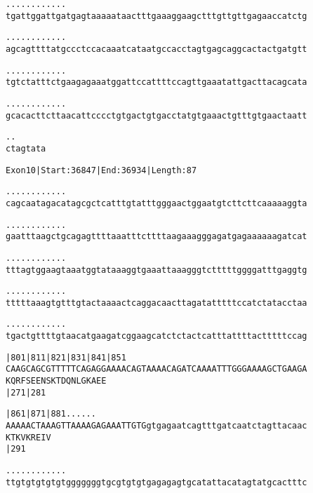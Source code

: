 \documentclass{article}
\begin{document}
\newpage
\begin{alltt}
  .    .    .    .    .    .    .    .    .    .    .    .
tgattggattgatgagtaaaaataactttgaaaggaagctttgttgttgagaaccatctg



  .    .    .    .    .    .    .    .    .    .    .    .
agcagttttatgccctccacaaatcataatgccacctagtgagcaggcactactgatgtt



  .    .    .    .    .    .    .    .    .    .    .    .
tgtctatttctgaagagaaatggattccattttccagttgaaatattgacttacagcata



  .    .    .    .    .    .    .    .    .    .    .    .
gcacacttcttaacattcccctgtgactgtgacctatgtgaaactgtttgtgaactaatt



  .    .
ctagtata


\end{alltt}
\newpage
\begin{alltt}
Exon 10 | Start: 36847 | End: 36934 | Length: 87

.    .    .    .    .    .    .    .    .    .    .    .
cagcaatagacatagcgctcatttgtatttgggaactggaatgtcttcttcaaaaaggta



.    .    .    .    .    .    .    .    .    .    .    .
gaatttaagctgcagagttttaaatttcttttaagaaagggagatgagaaaaaagatcat



.    .    .    .    .    .    .    .    .    .    .    .
tttagtggaagtaaatggtataaaggtgaaattaaagggtctttttggggatttgaggtg



.    .    .    .    .    .    .    .    .    .    .    .
tttttaaagtgtttgtactaaaactcaggacaacttagatatttttccatctatacctaa



.    .    .    .    .    .    .    .    .    .    .    .
tgactgttttgtaacatgaagatcggaagcatctctactcatttattttactttttccag



      |801      |811      |821      |831      |841      |851
CAAGCAGCGTTTTTCAGAGGAAAACAGTAAAACAGATCAAAATTTGGGAAAAGCTGAAGA
 K  Q  R  F  S  E  E  N  S  K  T  D  Q  N  L  G  K  A  E  E
                |271                          |281

      |861      |871      |881  .    .    .    .    .    .
AAAAACTAAAGTTAAAAGAGAAATTGTGgtgagaatcagtttgatcaatctagttacaac
 K  T  K  V  K  R  E  I  V
                |291

  .    .    .    .    .    .    .    .    .    .    .    .
ttgtgtgtgtgtgggggggtgcgtgtgtgagagagtgcatattacatagtatgcactttc



\end{alltt}
\end{document}
